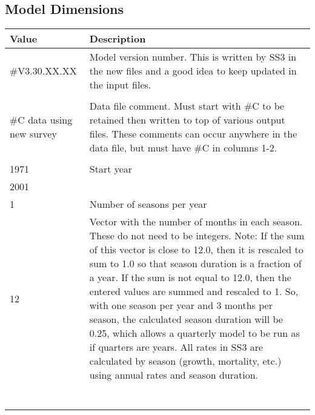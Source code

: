 \hypertarget{ModelDimensions}{}
\subsection[Model Dimensions]{\protect\hypertarget{ModelDimensions}{Model Dimensions}}
\begin{center}
	\begin{longtable}{p{3cm} p{12cm}}
		\hline
		\textbf{Value} & \textbf{Description} \Tstrut\Bstrut\\
		\hline
		\#V3.30.XX.XX & \multirow{1}{1cm}[-0.1cm]{\parbox{12cm}{Model version number. This is written by SS3 in the new files and a good idea to keep updated in the input files.}} \Tstrut\\
		& \Bstrut\\

		\hline
		\#C data using new survey & \multirow{1}{1cm}[-0.1cm]{\parbox{12cm}{Data file comment. Must start with \#C to be retained then written to top of various output files. These comments can occur anywhere in the data file, but must have \#C in columns 1-2.}} \Tstrut\\
		&  \Bstrut\\

		\hline
		1971 & Start year \Tstrut\Bstrut\\

		\hline
		2001 & \raisebox{0.1\ht\strutbox}{\hypertarget{EndYear}{End year}} \Tstrut\Bstrut\\

		\hline
		1 & Number of seasons per year \Tstrut\Bstrut\\

		\hline
		12 & \multirow{1}{1cm}[-0.1cm]{\parbox{12cm}{Vector with the number of months in each season. These do not need to be integers. Note: If the sum of this vector is close to 12.0, then it is rescaled to sum to 1.0 so that season duration is a fraction of a year. If the sum is not equal to 12.0, then the entered values are summed and rescaled to 1. So, with one season per year and 3 months per season, the calculated season duration will be 0.25, which allows a quarterly model to be run as if quarters are years. All rates in SS3 are calculated by season (growth, mortality, etc.) using annual rates and season duration.}} \Tstrut\\
		& \\
		& \\
		& \\
		& \\
		& \\
		& \\
		& \Bstrut\\
		

\end{longtable}
\end{center}
